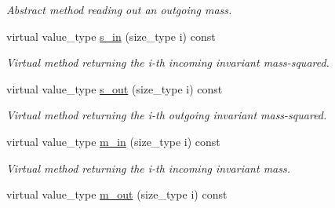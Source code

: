 \begin{DoxyCompactItemize}
\begin{DoxyCompactList}\small\item\em Abstract method reading out an outgoing mass. \end{DoxyCompactList}\item 
\hypertarget{a00442_aeb270d6a68cd7d9157848609250c652c}{virtual value\-\_\-type \hyperlink{a00442_aeb270d6a68cd7d9157848609250c652c}{s\-\_\-in} (size\-\_\-type i) const }\label{a00442_aeb270d6a68cd7d9157848609250c652c}

\begin{DoxyCompactList}\small\item\em Virtual method returning the i-\/th incoming invariant mass-\/squared. \end{DoxyCompactList}\item 
\hypertarget{a00442_ade1e4b8ea51198e20b2c987c8865a649}{virtual value\-\_\-type \hyperlink{a00442_ade1e4b8ea51198e20b2c987c8865a649}{s\-\_\-out} (size\-\_\-type i) const }\label{a00442_ade1e4b8ea51198e20b2c987c8865a649}

\begin{DoxyCompactList}\small\item\em Virtual method returning the i-\/th outgoing invariant mass-\/squared. \end{DoxyCompactList}\item 
\hypertarget{a00442_a422a6b7a79690e7bae81713bd8eb3b15}{virtual value\-\_\-type \hyperlink{a00442_a422a6b7a79690e7bae81713bd8eb3b15}{m\-\_\-in} (size\-\_\-type i) const }\label{a00442_a422a6b7a79690e7bae81713bd8eb3b15}

\begin{DoxyCompactList}\small\item\em Virtual method returning the i-\/th incoming invariant mass. \end{DoxyCompactList}\item 
\hypertarget{a00442_a72ab870e1cdff092a9102b346783f268}{virtual value\-\_\-type \hyperlink{a00442_a72ab870e1cdff092a9102b346783f268}{m\-\_\-out} (size\-\_\-type i) const }\label{a00442_a72ab870e1cdff092a9102b346783f268}


\end{DoxyCompactItemize}
